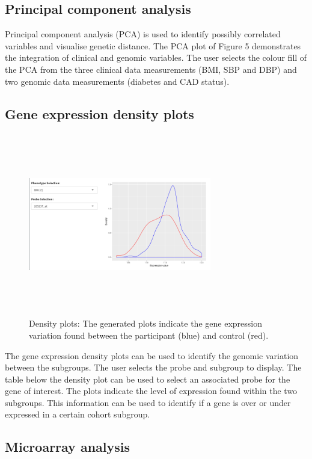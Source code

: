 \documentclass{bioinfo}
\begin{document}
\subsection{Principal component analysis}

Principal component analysis (PCA) is used to identify possibly correlated variables and visualise genetic distance. The PCA plot of Figure 5 demonstrates the integration of clinical and genomic variables. The user selects the colour fill of the PCA from the three clinical data measurements (BMI, SBP and DBP) and two genomic data measurements (diabetes and CAD status). 



\subsection{Gene expression density plots}
\begin{figure}[!h]
\includegraphics[width=8cm, height=8cm]{densityplot.png}
\caption{Density plots: The generated plots indicate the gene expression variation found between the participant (blue) and control (red).}
\end{figure}


The gene expression density plots can be used to identify the genomic variation between the subgroups. The user selects the probe and subgroup to display. The table below the density plot can be used to select an associated probe for the gene of interest. The plots indicate the level of expression found within the two subgroups. This information can be used to identify if a gene is over or under expressed in a certain cohort subgroup.

\subsection{Microarray analysis}
\end{document}
